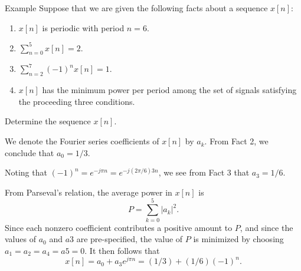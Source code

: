 \begin{frame}{Example}
    Suppose that we are given the following facts about a sequence $x[n]$:
    \begin{enumerate}
        \item $x[n]$ is periodic with period $n=6$.
        \item $\sum_{n=0}^{5}x[n] = 2$.
        \item $\sum_{n=2}^{7}(-1)^nx[n] = 1$.
        \item $x[n]$ has the minimum power per period among the set of signals satisfying the proceeding three conditions.
    \end{enumerate}
    Determine the sequence $x[n]$.
\end{frame}

\begin{frame}
    {
        We denote the Fourier series coefficients of $x[n]$ by $a_k$. From Fact 2, we conclude that $a_0 = 1/3$.\par \pause
        Noting that $(-1)^n  = e^{-j\pi n}= e^{-j(2\pi/6)3n}$, we see from Fact 3 that $a_3 = 1/6$.\par\pause From Parseval's relation, the average power in $x[n]$ is
        \begin{equation*}
            P = \sum_{k=0}^{5}|a_k|^2.
        \end{equation*}
        Since each nonzero coefficient contributes a positive amount to $P$, and since the values of $a_0$ and $a3$ are pre-specified, the value of $P$ is minimized by choosing $a_1 = a_2 = a_4 = a5 = 0$. It then follows that
        \begin{equation*}
            x[n] = a_0 + a_3 e^{j\pi n} = (1/3) + (1/6)(-1)^n.
        \end{equation*}
        \pause
        \begin{figure}
            \centering
            
        \end{figure}
    }
\end{frame}



%
